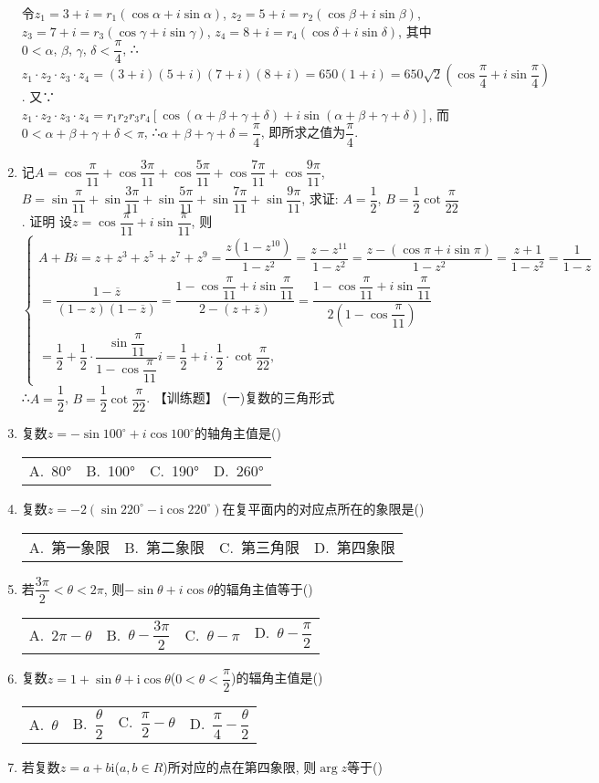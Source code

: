 \documentclass[10pt,a4paper]{article}
\newcommand{\fourch}[4]{\par\begin{tabular}{p{.23\textwidth}p{.23\textwidth}p{.23\textwidth}p{.23\textwidth}}
A.~#1 &B.~#2& C.~#3& D.~#4
\end{tabular}}
\begin{document}
\begin{enumerate}[1.]
令$z_1=3+i=r_1(\cos \alpha +i\sin \alpha)$, $z_2=5+i=r_2(\cos \beta +i\sin \beta)$,
$z_3=7+i=r_3(\cos \gamma +i\sin \gamma)$, $z_4=8+i=r_4(\cos \delta +i\sin \delta)$, 其中$0<\alpha$, $\beta$, $\gamma$, $\delta <\dfrac{\pi }4$,
∴$z_1\cdot z_2\cdot z_3\cdot z_4=(3+i)(5+i)(7+i)(8+i)=650(1+i)=650\sqrt 2(\cos \dfrac{\pi }4+i\sin \dfrac{\pi }4)$.
又∵$z_1\cdot z_2\cdot z_3\cdot z_4=r_1r_2r_3r_4[\cos (\alpha +\beta +\gamma +\delta)+i\sin (\alpha +\beta +\gamma +\delta)]$,
而$0<\alpha +\beta +\gamma +\delta <\pi$, ∴$\alpha +\beta +\gamma +\delta =\dfrac{\pi }4$, 即所求之值为$\dfrac{\pi }4$.
\item 记$A=\cos \dfrac{\pi }{11}+\cos \dfrac{3\pi }{11}+\cos \dfrac{5\pi }{11}+\cos \dfrac{7\pi }{11}+\cos \dfrac{9\pi }{11}$, $B=\sin \dfrac{\pi }{11}+\sin \dfrac{3\pi }{11}+\sin \dfrac{5\pi }{11}+\sin \dfrac{7\pi }{11}+\sin \dfrac{9\pi }{11}$, 求证: $A=\dfrac 12$, $B=\dfrac 12\cot \dfrac{\pi }{22}$.
证明  设$z=\cos \dfrac{\pi }{11}+i\sin \dfrac{\pi }{11}$, 则
$\begin{cases} A+Bi=z+z^3+z^5+z^7+z^9=\dfrac{z(1-{z^{10}})}{1-{z^2}}=\dfrac{z-{z^{11}}}{1-{z^2}}=\dfrac{z-(\cos \pi +i\sin \pi)}{1-{z^2}}=\dfrac{z+1}{1-{z^2}}=\dfrac 1{1-z} \\ =\dfrac{1-\overline z}{(1-z)(1-\overline z)}=\dfrac{1-\cos \dfrac{\pi }{11}+i\sin \dfrac{\pi }{11}}{2-(z+\overline z)}=\dfrac{1-\cos \dfrac{\pi }{11}+i\sin \dfrac{\pi }{11}}{2(1-\cos \dfrac{\pi }{11})} \\ =\dfrac 12+\dfrac 12\cdot \dfrac{\sin \dfrac{\pi }{11}}{1-\cos \dfrac{\pi }{11}}i=\dfrac 12+i\cdot \dfrac 12\cdot \cot \dfrac{\pi }{22},
\end{cases}$
∴$A=\dfrac 12$, $B=\dfrac 12\cot \dfrac{\pi }{22}$.
【训练题】
(一)复数的三角形式
\item 复数$z=-\sin 100^\circ +i\cos 100^\circ$的轴角主值是()
\fourch{80°}{100°}{190°}{260°}
\item 复数$z=-2(\sin 220^\circ -\mathrm{i}\cos 220^\circ)$在复平面内的对应点所在的象限是()
\fourch{第一象限}{第二象限}{第三角限}{第四象限}
\item 若$\dfrac{3\pi }2<\theta <2\pi$, 则$-\sin \theta +i\cos \theta$的辐角主值等于()
\fourch{$2\pi -\theta$}{$\theta -\dfrac{3\pi }2$}{$\theta -\pi$}{$\theta -\dfrac{\pi }2$}
\item 复数$z=1+\sin \theta +\mathrm{i}\cos \theta$($0<\theta <\dfrac{\pi }2$)的辐角主值是()
\fourch{$\theta$}{$\dfrac{\theta }2$}{$\dfrac{\pi }2-\theta$}{$\dfrac{\pi }4-\dfrac{\theta }2$}
\item 若复数$z=a+b\mathrm{i}$($a,b\in R$)所对应的点在第四象限, 则$\arg z$等于()

\end{enumerate}
\end{document}
